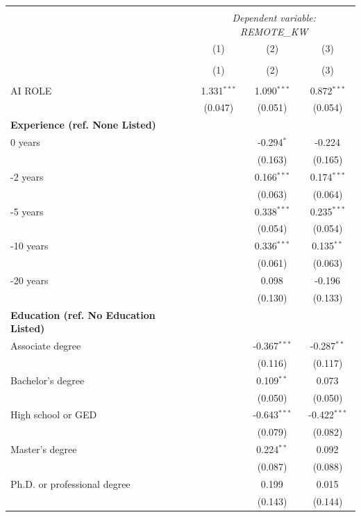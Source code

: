 \begin{table}[!htbp] \centering
\begin{tabular}{@{\extracolsep{5pt}}lccc}
\\[-1.8ex]\hline
\hline \\[-1.8ex]
& \multicolumn{3}{c}{\textit{Dependent variable: REMOTE_KW}} \
\cr \cline{2-4}
\\[-1.8ex] & \multicolumn{1}{c}{(1)} & \multicolumn{1}{c}{(2)} & \multicolumn{1}{c}{(3)}  \\
\\[-1.8ex] & (1) & (2) & (3) \\
\hline \\[-1.8ex]
 AI ROLE & 1.331$^{***}$ & 1.090$^{***}$ & 0.872$^{***}$ \\
& (0.047) & (0.051) & (0.054) \\
 \textbf{Experience (ref. None Listed)}\\
0 years & & -0.294$^{*}$ & -0.224$^{}$ \\
& & (0.163) & (0.165) \\
 \quad 1-2 years & & 0.166$^{***}$ & 0.174$^{***}$ \\
& & (0.063) & (0.064) \\
 \quad 3-5 years & & 0.338$^{***}$ & 0.235$^{***}$ \\
& & (0.054) & (0.054) \\
 \quad 6-10 years & & 0.336$^{***}$ & 0.135$^{**}$ \\
& & (0.061) & (0.063) \\
 \quad 11-20 years & & 0.098$^{}$ & -0.196$^{}$ \\
& & (0.130) & (0.133) \\
 \textbf{Education (ref. No Education Listed)}\\
Associate degree & & -0.367$^{***}$ & -0.287$^{**}$ \\
& & (0.116) & (0.117) \\
 \quad Bachelor's degree & & 0.109$^{**}$ & 0.073$^{}$ \\
& & (0.050) & (0.050) \\
 \quad High school or GED & & -0.643$^{***}$ & -0.422$^{***}$ \\
& & (0.079) & (0.082) \\
 \quad Master's degree & & 0.224$^{**}$ & 0.092$^{}$ \\
& & (0.087) & (0.088) \\
 \quad Ph.D. or professional degree & & 0.199$^{}$ & 0.015$^{}$ \\
& & (0.143) & (0.144) \\

\end{tabular}
\end{table}
